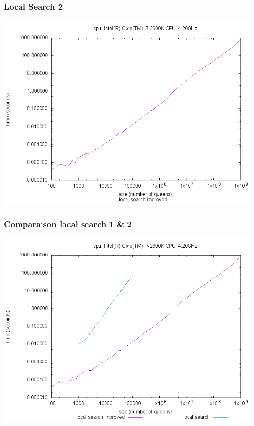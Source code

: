 \documentclass[9pt,a4paper]{beamer}
\begin{document}
\begin{frame}
	\frametitle{Local Search 2}

	\hspace{0.8cm} \includegraphics[height=0.9\textheight]{images/plot_lst_i7.png}
\end{frame}

\begin{frame}
	\frametitle{Comparaison local search 1 \& 2}

	\hspace{0.8cm} \includegraphics[height=0.9\textheight]{images/plot_lst_ls_i7.png}
\end{frame}
\end{document}
